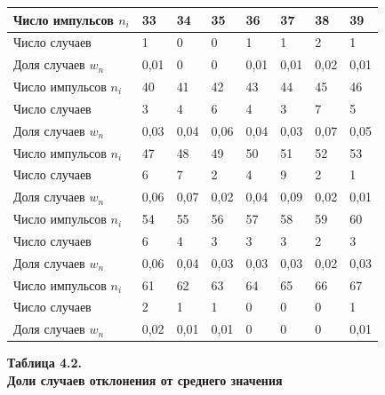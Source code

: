 

\begin{table}[H]
\centering
\begin{tabular}{|l|l|l|l|l|l|l|l|}
\hline
Число импульсов $n_i$ & 33   & 34   & 35   & 36   & 37   & 38   & 39   \\ \hline
Число случаев        & 1    & 0    & 0    & 1    & 1    & 2    & 1    \\ \hline
Доля случаев $w_n$    & 0,01 & 0    & 0    & 0,01 & 0,01 & 0,02 & 0,01 \\ \hline\hline
Число импульсов $n_i$ & 40   & 41   & 42   & 43   & 44   & 45   & 46   \\ \hline
Число случаев        & 3    & 4    & 6    & 4    & 3    & 7    & 5    \\ \hline
Доля случаев $w_n$    & 0,03 & 0,04 & 0,06 & 0,04 & 0,03 & 0,07 & 0,05 \\ \hline\hline
Число импульсов $n_i$ & 47   & 48   & 49   & 50   & 51   & 52   & 53   \\ \hline
Число случаев        & 6    & 7    & 2    & 4    & 9    & 2    & 1    \\ \hline
Доля случаев $w_n$    & 0,06 & 0,07 & 0,02 & 0,04 & 0,09 & 0,02 & 0,01 \\ \hline\hline
Число импульсов $n_i$ & 54   & 55   & 56   & 57   & 58   & 59   & 60   \\ \hline
Число случаев        & 6    & 4    & 3    & 3    & 3    & 2    & 3    \\ \hline
Доля случаев $w_n$    & 0,06 & 0,04 & 0,03 & 0,03 & 0,03 & 0,02 & 0,03 \\ \hline\hline
Число импульсов $n_i$ & 61   & 62   & 63   & 64   & 65   & 66   & 67   \\ \hline
Число случаев        & 2    & 1    & 1    & 0    & 0    & 0    & 1    \\ \hline
Доля случаев $w_n$    & 0,02 & 0,01 & 0,01 & 0    & 0    & 0    & 0,01 \\ \hline
\end{tabular}
\begin{flushright}
{\scriptsize \textbf{Таблица 4.2.}\\ \textbf {Доли случаев отклонения от среднего значения}}
\end{flushright}
\end{table}


